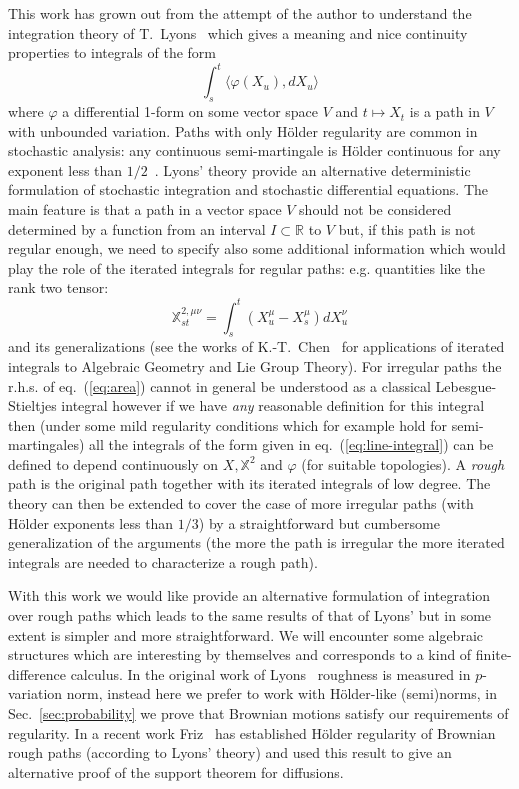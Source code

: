 \documentclass[a4paper,12pt,reqno]{amsproc}
\newcommand{\XX}{\mathbb{X}}
\newcommand{\RR}{\mathbb{R}}
\begin{document}
This work has grown out from the attempt of the author to understand
the integration theory of T.~Lyons~\cite{Lyons,lyonsbook} which gives a meaning
and nice continuity properties to integrals of the form
\begin{equation}
\label{eq:line-integral}
  \int_s^t \langle \varphi(X_u), dX_u\rangle
\end{equation}
where $\varphi$ a differential 1-form on some vector space $V$
and $t \mapsto X_t$ is a path in $V$ with unbounded
variation. Paths with only H\"older regularity are common in
stochastic analysis: any continuous semi-martingale is
H\"older continuous for any exponent less than $1/2$~\cite{RY}. Lyons'
theory provide an alternative deterministic formulation of stochastic
integration and stochastic differential equations. The main feature is
that a path in a vector space $V$ should not be considered determined 
by a function from an interval $I \subset \RR$ to $V$ but, if this
path is not regular enough, we need to specify also some additional
information which would play the role of the iterated integrals for
regular paths: e.g. quantities like the rank two tensor:
\begin{equation}
  \label{eq:area}
\XX^{2,\mu\nu}_{st} = \int_s^t (X^\mu_u-X^\mu_s) dX_u^\nu
\end{equation}
and its generalizations (see the works of K.-T.~Chen~\cite{ChenAll} for 
applications of iterated integrals to Algebraic Geometry and Lie Group Theory).
For irregular paths the r.h.s. of eq.~(\ref{eq:area}) cannot in
general be
understood as a classical Lebesgue-Stieltjes integral however if we have
\emph{any} reasonable definition for this integral then (under some
mild regularity conditions which for example hold for
semi-martingales) all the integrals of the form given in
eq.~(\ref{eq:line-integral}) can be defined to depend continuously on
$X,\XX^2$ and $\varphi$ (for suitable topologies). A \emph{rough} path
is the original path together with its iterated integrals of low
degree. The theory can then
be extended to cover the case of more irregular paths (with H\"older exponents less than
$1/3$) by a straightforward but cumbersome generalization of the arguments (the more the
path is irregular the more
iterated integrals are needed to characterize a rough path).
 
\bigskip

With this work we would like provide an alternative formulation of
integration over rough paths which leads to the same results of that
of Lyons' but in some extent is simpler and more
straightforward. We will encounter some algebraic structures
which are interesting by themselves and corresponds to a kind of
finite-difference calculus. 
In the original work of  Lyons~\cite{Lyons}  roughness is measured in
$p$-variation norm, instead here we prefer to work with H\"older-like
(semi)norms, in Sec.~\ref{sec:probability} we prove that Brownian
motions satisfy our requirements of regularity. In a recent work 
Friz~\cite{fritz} has established H\"older regularity of Brownian rough
paths (according to  Lyons' theory) and used this result to give an
alternative proof of the support theorem for diffusions.  
\end{document}

